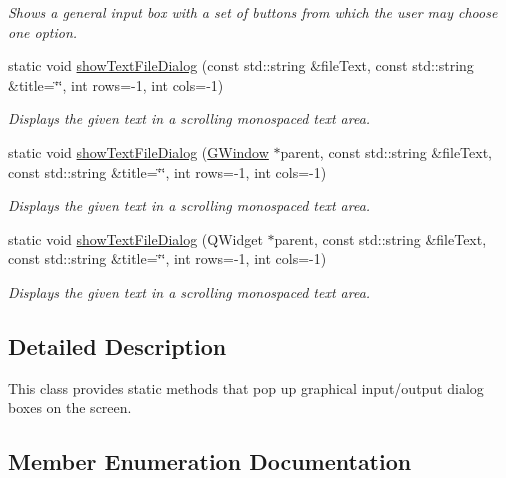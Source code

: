 \begin{DoxyCompactItemize}
\begin{DoxyCompactList}\small\item\em Shows a general input box with a set of buttons from which the user may choose one option. \end{DoxyCompactList}\item 
static void \mbox{\hyperlink{classGOptionPane_a8c5008daa752e1e66585def05a70e925}{show\+Text\+File\+Dialog}} (const std\+::string \&file\+Text, const std\+::string \&title=\char`\"{}\char`\"{}, int rows=-\/1, int cols=-\/1)
\begin{DoxyCompactList}\small\item\em Displays the given text in a scrolling monospaced text area. \end{DoxyCompactList}\item 
static void \mbox{\hyperlink{classGOptionPane_af8cf594b9d9b1c6569fc8a3ca2ee0602}{show\+Text\+File\+Dialog}} (\mbox{\hyperlink{classGWindow}{G\+Window}} $\ast$parent, const std\+::string \&file\+Text, const std\+::string \&title=\char`\"{}\char`\"{}, int rows=-\/1, int cols=-\/1)
\begin{DoxyCompactList}\small\item\em Displays the given text in a scrolling monospaced text area. \end{DoxyCompactList}\item 
static void \mbox{\hyperlink{classGOptionPane_a6d1d2769369649efbc5142804ff8b165}{show\+Text\+File\+Dialog}} (Q\+Widget $\ast$parent, const std\+::string \&file\+Text, const std\+::string \&title=\char`\"{}\char`\"{}, int rows=-\/1, int cols=-\/1)
\begin{DoxyCompactList}\small\item\em Displays the given text in a scrolling monospaced text area. \end{DoxyCompactList}\end{DoxyCompactItemize}


\subsection{Detailed Description}
This class provides static methods that pop up graphical input/output dialog boxes on the screen. 

\subsection{Member Enumeration Documentation}
\mbox{\label{classGOptionPane_a1cc9e8685029e39646671ed71f32d47d}} 
